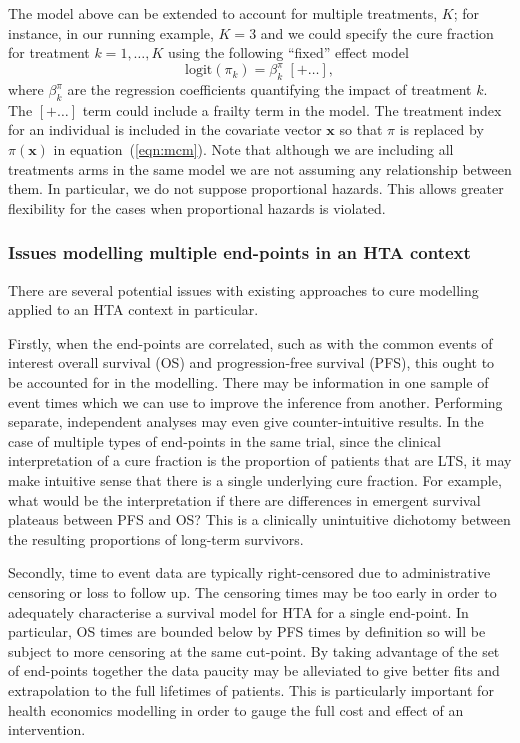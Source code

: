 \documentclass[AMA,STIX1COL]{WileyNJD-v2}
\begin{document}
The model above can be extended to account for multiple treatments, $K$; for instance, in our running example, $K=3$ and we could specify the cure fraction for treatment $k=1,\ldots,K$ using the following ``fixed'' effect model
\begin{equation}
\label{eqn:pi_regn}
\mbox{logit}(\pi_{k}) = \beta^{\pi}_{k} \; [+ \ldots],
\end{equation}
\noindent
where $\beta^{\pi}_k$ are the regression coefficients quantifying the impact of treatment $k$.
The $[+ \ldots]$ term could include a frailty term in the model.
The treatment index for an individual is included in the covariate vector $\bm{x}$ so that $\pi$ is replaced by $\pi(\bm{x})$ in equation~(\ref{eqn:mcm}).
Note that although we are including all treatments arms in the same model we are not assuming any relationship between them. In particular, we do not suppose proportional hazards. This allows greater flexibility for the cases when proportional hazards is violated.

\subsubsection{Issues modelling multiple end-points in an HTA context} \label{section:issues}
There are several potential issues with existing approaches to cure modelling applied to an HTA context in particular.

Firstly, when the end-points are correlated, such as with the common events of interest overall survival (OS) and progression-free survival (PFS), this ought to be accounted for in the modelling.
There may be information in one sample of event times which we can use to improve the inference from another.
Performing separate, independent analyses may even give counter-intuitive results.
In the case of multiple types of end-points in the same trial, since the clinical interpretation of a cure fraction is the proportion of patients that are LTS,
it may make intuitive sense that there is a single underlying cure fraction.
For example, what would be the interpretation if there are differences in emergent survival plateaus between PFS and OS?
This is a clinically unintuitive dichotomy between the resulting proportions of long-term survivors.

Secondly, time to event data are typically right-censored due to administrative censoring or loss to follow up.
The censoring times may be too early in order to adequately characterise a survival model for HTA for a single end-point.
In particular, OS times are bounded below by PFS times by definition so will be subject to more censoring at the same cut-point.
By taking advantage of the set of end-points together the data paucity may be alleviated to give better fits and extrapolation to the full lifetimes of patients.
This is particularly important for health economics modelling in order to gauge the full cost and effect of an intervention.
\end{document}
